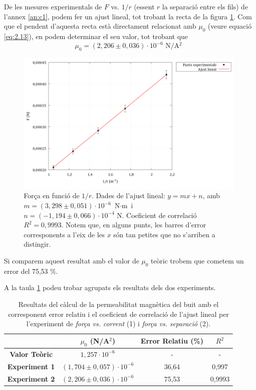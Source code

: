 \documentclass[a4paper,10.5pt]{report}
\begin{document}
De les mesures experimentals de $F$ vs. $1/r$ (essent $r$ la separació entre els fils) de l'annex \ref{an:c1}, podem fer un ajust lineal, tot trobant la recta de la figura \ref{fig:2.5}. Com que el pendent d'aquesta recta està directament relacionat amb $\mu_0$ (veure equació \eqref{eq:2.13}), en podem determinar el seu valor, tot trobant que 
\begin{equation*}
	\mu_0 = (2,206 \pm 0,036)\cdot 10^{-6}\text{ N$/$A$^2$}
\end{equation*}

\begin{figure}[H]
	\centering
	\includegraphics[width=0.9\linewidth]{screenshot018}
	\caption{Força en funció de $1/r$. Dades de l'ajust lineal: $y=mx+n$, amb $m = (3,298\pm0,051)\cdot 10^{-6} \text{ N$\cdot$m}$ i $n=(-1,194\pm 0,066)\cdot10^{-4} \text{ N}$. Coeficient de correlació $R^2=0,9993$. Notem que, en alguns punts, les barres d'error corresponents a l'eix de les $x$ són tan petites que no s'arriben a distingir.}
	\label{fig:2.5}
\end{figure}

Si comparem aquest resultat amb el valor de $\mu_0$ teòric trobem que cometem un error del 75,53 \%.

A la taula \ref{tab:2.1} podeu trobar agrupats els resultats dels dos experiments.
\begin{table}[h]
	\centering
	\caption{Resultats del càlcul de la permeabilitat magnètica del buit amb el corresponent error relatiu i el coeficient de correlació de l'ajust lineal per l'experiment de \textit{força vs. corrent} (1) i \textit{força vs. separació} (2).}
	\begin{tabular}{cccc}
		\toprule
		& $\mu_0$ (N/A$^2$) & Error Relatiu (\%) & $R^2$ \\
		\midrule
		\textbf{Valor Teòric} & $1,257\cdot10^{-6}$ & - & - \\
		\textbf{Experiment 1} & $(1,704\pm0,057)\cdot 10^{-6}$ & 36,64 & 0,997 \\
		\textbf{Experiment 2} & $(2,206\pm0,036)\cdot 10^{-6}$ & 75,53 & 0,9993 \\
		\bottomrule
	\end{tabular}
	\label{tab:2.1}
\end{table}
\end{document}
